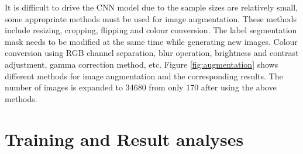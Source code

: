 \documentclass[12pt, a4paper]{article}
\begin{document}
\begin{multicols}{2}
	\par
	It is difficult to drive the CNN model due to the sample sizes are relatively small, some appropriate methods must be used for image augmentation. These methods include resizing, cropping, flipping and colour conversion. The label segmentation mask needs to be modified at the same time while generating new images. Colour conversion using RGB channel separation, blur operation, brightness and contrast adjustment, gamma correction method, etc. Figure \ref{fig:augmentation} shows different methods for image augmentation and the corresponding results. The number of images is expanded to 34680 from only 170 after using the above methods.

	\section{Training and Result analyses } \justify
	

\end{multicols}
\end{document}
